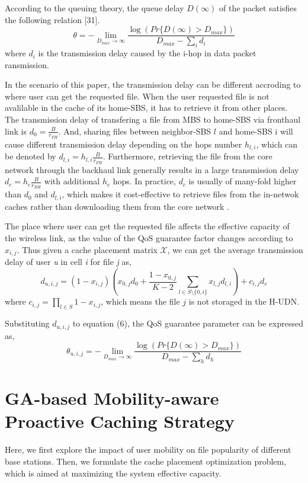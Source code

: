 \documentclass[conference]{IEEEtran}
\begin{document}
According to the queuing theory, the queue delay $D(\infty)$ of the packet satisfies the following relation [31].
\begin{equation}
\theta=-\lim_{D_{max}\to \infty}\frac{\log(Pr\{D(\infty)>D_{max}\})}{D_{max}-\sum_i d_i}
\end{equation}
where $d_i$ is the transmission delay caused by the i-hop in data packet ransmission.

In the scenario of this paper, the transmission delay can be different accroding to where user can get the requested file. When the user requested file is not avalilable in the cache of its home-SBS, it has to retrieve it from other places. The transmission delay of transfering a file from MBS to home-SBS via fronthaul link is $d_0=\frac{B}{r_{FH}}$. And, sharing files between neighbor-SBS $l$ and home-SBS i will cause different transmission delay depending on the hops number $h_{l,i}$, which can be denoted by $d_{l,i}=h_{l,i}\frac{B}{r_{FH}}$. Furthermore, retrieving the file from the core network through the backhaul link generally results in a large transmission delay $d_c=h_c\frac{B}{r_{BH}}$ with additional $h_c$ hops. In practice, $d_c$ is usually of many-fold higher than $d_0$ and $d_{l,i}$, which makes it cost-effective to retrieve files from the in-netwok caches rather than downloading them from the core network \cite{6736753}.

The place where user can get the requested file affects the effective capacity of the wireless link, as the value of the QoS guarantee factor changes according to $x_{i,j}$. Thus given a cache placement matrix $\mathcal{X}$, we can get the average transmission delay of user \emph{u} in cell \emph{i} for file \emph{j} as,
\begin{equation}
d_{u,i,j}=(1-x_{i,j})(x_{0,j}d_0+\frac{1-x_{0,j}}{K-2}\sum_{l\in S\setminus{\{0,i\}}}x_{l,j}d_{l,i})+c_{i,j}d_c
\end{equation}
where $c_{i,j}= \prod_{l\in S}1-x_{i,j}$, which means the file $j$ is not storaged in the H-UDN.

Substituting $d_{u,i,j}$ to equation (6), the QoS guarantee parameter can be expressed as,
\begin{equation}
\theta_{u,i,j}=-\lim_{D_{max}\to \infty}\frac{\log(Pr\{D(\infty)>D_{max}\})}{D_{max}-\sum_h d_h}
\end{equation}

\section{GA-based Mobility-aware Proactive Caching Strategy}
Here, we first explore the impact of user mobility on file popularity of different base stations. Then, we formulate the cache placement optimization problem, which is aimed at maximizing the system effective capacity.
\end{document}
